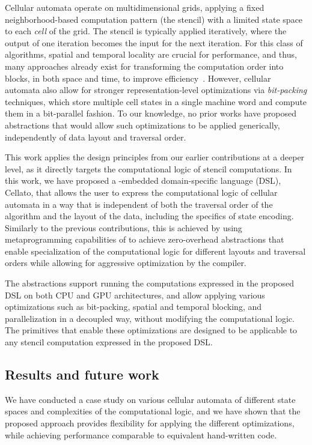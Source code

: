 Cellular automata operate on multidimensional grids, applying a fixed neighborhood-based computation pattern (the stencil) with a limited state space to each \emph{cell} of the grid. The stencil is typically applied iteratively, where the output of one iteration becomes the input for the next iteration. For this class of algorithms, spatial and temporal locality are crucial for performance, and thus, many approaches already exist for transforming the computation order into blocks, in both space and time, to improve efficiency~\cite{afanasyev2021gridtools,christen2011patus,matsumura2020an5d}. However, cellular automata also allow for stronger representation-level optimizations via \emph{bit-packing} techniques, which store multiple cell states in a single machine word and compute them in a bit-parallel fashion. To our knowledge, no prior works have proposed abstractions that would allow such optimizations to be applied generically, independently of data layout and traversal order.

This work applies the design principles from our earlier contributions at a deeper level, as it directly targets the computational logic of stencil computations. In this work, we have proposed a \cpp-embedded domain-specific language (DSL), Cellato, that allows the user to express the computational logic of cellular automata in a way that is independent of both the traversal order of the algorithm and the layout of the data, including the specifics of state encoding. Similarly to the previous contributions, this is achieved by using metaprogramming capabilities of \cpp to achieve zero-overhead abstractions that enable
specialization of the computational logic for different layouts and traversal orders while allowing for aggressive optimization by the compiler.

The abstractions support running the computations expressed in the proposed DSL on both CPU and GPU architectures, and allow applying various optimizations such as bit-packing, spatial and temporal blocking, and parallelization in a decoupled way, without modifying the computational logic. The primitives that enable these optimizations are designed to be applicable to any stencil computation expressed in the proposed DSL\@.


\subsection{Results and future work}\label{sec:stencil-computations-results}

We have conducted a case study on various cellular automata of different state spaces and complexities of the computational logic, and we have shown that the proposed approach provides flexibility for applying the different optimizations, while achieving performance comparable to equivalent hand-written code.

